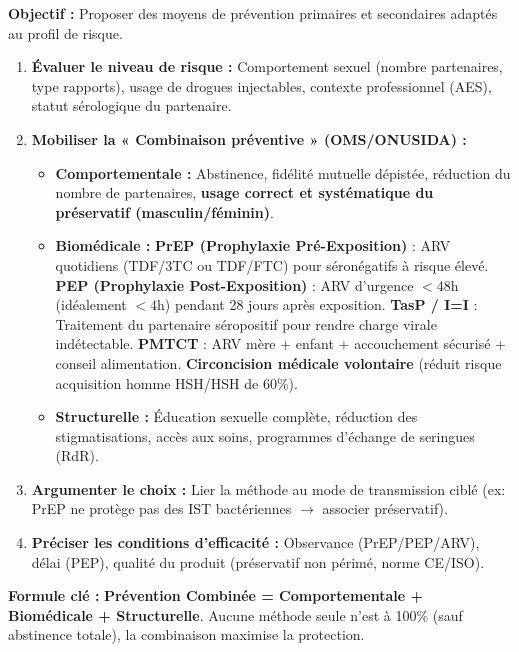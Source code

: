\documentclass[11pt]{article}
\begin{document}
\begin{methode}
\textbf{Objectif :} Proposer des moyens de prévention primaires et secondaires adaptés au profil de risque.
\begin{enumerate}
    \item \textbf{Évaluer le niveau de risque :} Comportement sexuel (nombre partenaires, type rapports), usage de drogues injectables, contexte professionnel (AES), statut sérologique du partenaire.
    \item \textbf{Mobiliser la « Combinaison préventive » (OMS/ONUSIDA) :}
    \begin{itemize}
        \item \textbf{Comportementale :} Abstinence, fidélité mutuelle dépistée, réduction du nombre de partenaires, \textbf{usage correct et systématique du préservatif (masculin/féminin)}.
        \item \textbf{Biomédicale :} \textbf{PrEP (Prophylaxie Pré-Exposition)} : ARV quotidiens (TDF/3TC ou TDF/FTC) pour séronégatifs à risque élevé. \textbf{PEP (Prophylaxie Post-Exposition)} : ARV d'urgence $< 48$h (idéalement $< 4$h) pendant 28 jours après exposition. \textbf{TasP / I=I} : Traitement du partenaire séropositif pour rendre charge virale indétectable. \textbf{PMTCT} : ARV mère + enfant + accouchement sécurisé + conseil alimentation. \textbf{Circoncision médicale volontaire} (réduit risque acquisition homme HSH/HSH de 60\%).
        \item \textbf{Structurelle :} Éducation sexuelle complète, réduction des stigmatisations, accès aux soins, programmes d'échange de seringues (RdR).
    \end{itemize}
    \item \textbf{Argumenter le choix :} Lier la méthode au mode de transmission ciblé (ex: PrEP ne protège pas des IST bactériennes $\rightarrow$ associer préservatif).
    \item \textbf{Préciser les conditions d'efficacité :} Observance (PrEP/PEP/ARV), délai (PEP), qualité du produit (préservatif non périmé, norme CE/ISO).
\end{enumerate}
\textbf{Formule clé :} \textbf{Prévention Combinée = Comportementale + Biomédicale + Structurelle}. Aucune méthode seule n'est à 100\% (sauf abstinence totale), la combinaison maximise la protection.
\end{methode}
\end{document}
